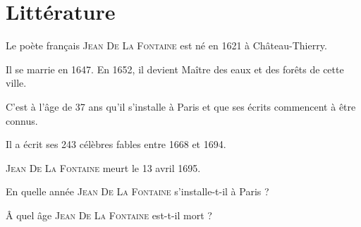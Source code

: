\section{Littérature}

Le poète français \textsc{Jean De La Fontaine} est né en 1621 à Château-Thierry.

Il se marrie en 1647. 
En 1652, il devient Maître des eaux et des forêts de cette ville.

C'est à l'âge de 37 ans qu'il s'installe à Paris et que ses écrits commencent à être connus.

Il a écrit ses 243 célèbres fables entre 1668 et 1694.

\textsc{Jean De La Fontaine} meurt le 13 avril 1695.

\begin{questions}
	\question En quelle année \textsc{Jean De La Fontaine} s'installe-t-il à Paris ?
	
	\question 
	
	\question \^A quel âge \textsc{Jean De La Fontaine} est-t-il mort ?
\end{questions}